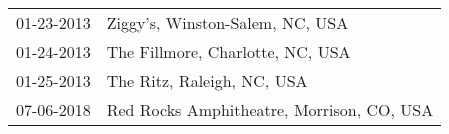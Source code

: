 \begin{supertabular}{ll}
 01-23-2013 &            Ziggy's, Winston-Salem, NC, USA \\
 01-24-2013 &           The Fillmore, Charlotte, NC, USA \\
 01-25-2013 &                 The Ritz, Raleigh, NC, USA \\
 07-06-2018 &  Red Rocks Amphitheatre, Morrison, CO, USA \\
\end{supertabular}
